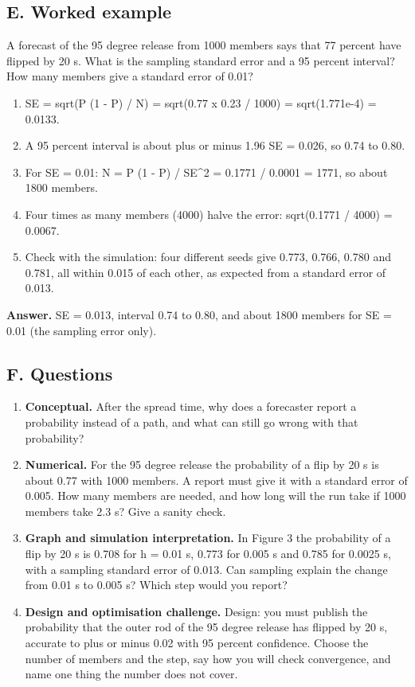 \documentclass[11pt,a4paper]{article}
\begin{document}
\subsection*{E. Worked example}
A forecast of the 95 degree release from 1000 members says that 77 percent have flipped by 20 s. What is the sampling standard error and a 95 percent interval? How many members give a standard error of 0.01?
\begin{enumerate}[nosep]
\item SE = sqrt(P (1 - P) / N) = sqrt(0.77 x 0.23 / 1000) = sqrt(1.771e-4) = 0.0133.
\item A 95 percent interval is about plus or minus 1.96 SE = 0.026, so 0.74 to 0.80.
\item For SE = 0.01: N = P (1 - P) / SE\textasciicircum{}2 = 0.1771 / 0.0001 = 1771, so about 1800 members.
\item Four times as many members (4000) halve the error: sqrt(0.1771 / 4000) = 0.0067.
\item Check with the simulation: four different seeds give 0.773, 0.766, 0.780 and 0.781, all within 0.015 of each other, as expected from a standard error of 0.013.
\end{enumerate}
\textbf{Answer.} SE = 0.013, interval 0.74 to 0.80, and about 1800 members for SE = 0.01 (the sampling error only).

\subsection*{F. Questions}
\begin{enumerate}[nosep]
\item \textbf{Conceptual.} After the spread time, why does a forecaster report a probability instead of a path, and what can still go wrong with that probability?
\item \textbf{Numerical.} For the 95 degree release the probability of a flip by 20 s is about 0.77 with 1000 members. A report must give it with a standard error of 0.005. How many members are needed, and how long will the run take if 1000 members take 2.3 s? Give a sanity check.
\item \textbf{Graph and simulation interpretation.} In Figure 3 the probability of a flip by 20 s is 0.708 for h = 0.01 s, 0.773 for 0.005 s and 0.785 for 0.0025 s, with a sampling standard error of 0.013. Can sampling explain the change from 0.01 s to 0.005 s? Which step would you report?
\item \textbf{Design and optimisation challenge.} Design: you must publish the probability that the outer rod of the 95 degree release has flipped by 20 s, accurate to plus or minus 0.02 with 95 percent confidence. Choose the number of members and the step, say how you will check convergence, and name one thing the number does not cover.
\end{enumerate}
\end{document}
